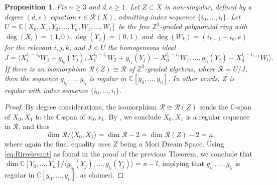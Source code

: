 \documentclass[a4paper,11pt]{amsart}
\theoremstyle{plain}
\newtheorem{proposition}[theorem]{Proposition}
\theoremstyle{definition}
\newcommand{\C}{\mathbb{C}}
\newcommand{\R}{\mathcal{R}}
\newcommand{\Z}{\mathbb{Z}}
\begin{document}

\begin{proposition}\label{prop:converse}
    Fix $n \geq 3$ and $d,e \geq 1$. Let $Z \subset X$ is non-singular, defined by a degree $(d,e)$ equation $r \in \R(X)$, admitting index sequence $\{i_0,\dots,i_l\}$. Let $U = \C[X_0, X_1, Y_0, \dots, Y_n, W_1,\dots,W_l]$ be the free $\Z^2$-graded polynomial ring with $\deg(X_i) = (1,0), \deg(Y_j) = (0,1)$ and $\deg(W_k) = (i_{k-1} - i_k,e)$ for the relevant $i,j,k$, and $J\lhd U$ the homogeneous ideal
    \begin{equation*}
       J = \langle X_1^{i_1 - i_0} W_1 + g_{i_0}(Y_j), X_1^{i_2 - i_1} W_2 + g_{i_1}(Y_j) - X_0^{i_1 - i_0} W_1,  \dots , g_{i_l}(Y_j) - X_0^{i_l - i_{l-1}} W_l\rangle.
    \end{equation*}
    If there is an isomorphism $\R(Z) \cong \R$ of $\Z^2$-graded algebras, where $\R = U/J$, then the sequence $g_{i_0},\dots,g_{i_l}$ is regular in $\C[y_0,\dots,y_n]$. In other words, $Z$ is regular with index sequence $\{i_0,\dots,i_l\}$.
\end{proposition}

\begin{proof}
    By degree considerations, the isomorphism $\R \cong \R(Z)$ sends the $\C$-span of $X_0, X_1$ to the $\C$-span of $x_0,x_1$. By \cite[Proposition 2.7]{MDS}, we conclude $X_0, X_1$ is a regular sequence in $\R$, and thus
    \[
    \dim \R / \langle X_0, X_1 \rangle = \dim \R -2 = \dim \R(Z) -2 = n,
    \]
    where again the final equality uses $Z$ being a Mori Dream Space. Using \eqref{eq:Rirrelevant} as found in the proof of the previous Theorem, we conclude that $\dim \C[Y_0,\dots,Y_n]/\langle g_{i_0}(Y_j), \dots, g_{i_l}(Y_j)\rangle = n-l$, implying that $g_{i_0},\dots,g_{i_l}$ is regular in $\C[y_0,\dots,y_n]$, as claimed.
\end{proof}
\end{document}
